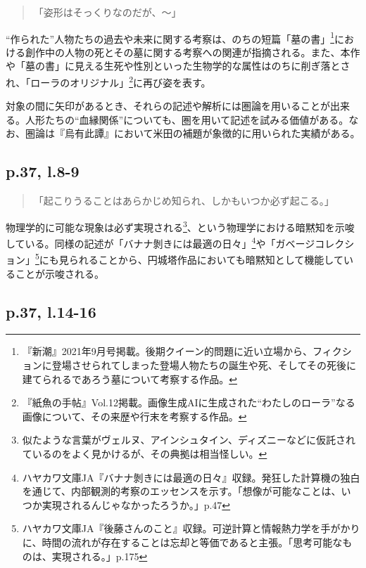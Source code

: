 \documentclass[10pt, a5paper, twoside]{jsarticle}
\theoremstyle{definition}
\begin{document}
		\begin{quote}

			「姿形はそっくりなのだが、〜」

		\end{quote}

		“作られた”人物たちの過去や未来に関する考察は、のちの短篇「墓の書」\footnote{『新潮』2021年9月号掲載。後期クイーン的問題に近い立場から、フィクションに登場させられてしまった登場人物たちの誕生や死、そしてその死後に建てられるであろう墓について考察する作品。}における創作中の人物の死とその墓に関する考察への関連が指摘される。また、本作や「墓の書」に見える生死や性別といった生物学的な属性はのちに削ぎ落とされ、「ローラのオリジナル」\footnote{『紙魚の手帖』Vol.12掲載。画像生成AIに生成された“わたしのローラ”なる画像について、その来歴や行末を考察する作品。}に再び姿を表す。

		対象の間に矢印があるとき、それらの記述や解析には圏論を用いることが出来る。人形たちの“血縁関係”についても、圏を用いて記述を試みる価値がある。なお、圏論は『烏有此譚』において米田の補題が象徴的に用いられた実績がある。

		\subsection{p.37, l.8-9}

		\begin{quote}

			「起こりうることはあらかじめ知られ、しかもいつか必ず起こる。」

		\end{quote}

		物理学的に可能な現象は必ず実現される\footnote{似たような言葉がヴェルヌ、アインシュタイン、ディズニーなどに仮託されているのをよく見かけるが、その典拠は相当怪しい。}、という物理学における暗黙知を示唆している。同様の記述が「バナナ剝きには最適の日々」\footnote{ハヤカワ文庫JA『バナナ剝きには最適の日々』収録。発狂した計算機の独白を通じて、内部観測的考察のエッセンスを示す。「想像が可能なことは、いつか実現されるんじゃなかったろうか。」p.47}や「ガベージコレクション」\footnote{ハヤカワ文庫JA『後藤さんのこと』収録。可逆計算と情報熱力学を手がかりに、時間の流れが存在することは忘却と等価であると主張。「思考可能なものは、実現される。」p.175}にも見られることから、円城塔作品においても暗黙知として機能していることが示唆される。

		\subsection{p.37, l.14-16}
\end{document}
